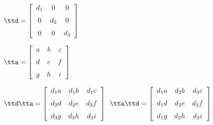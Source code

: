 {$\ttd = \left[ \begin {array}{ccc} d_1&0&0\\\noalign{\medskip}0&d_2&0
\\\noalign{\medskip}0&0&d_3\end {array} \right]$
 
$\tta = \left[ \begin {array}{ccc} a&b&c\\\noalign{\medskip}d&e&f
\\\noalign{\medskip}g&h&i\end {array} \right] $}
{$\ttd\tta= \left[ \begin {array}{ccc} d_1a&d_1b&d_1c\\\noalign{\medskip}d_2d&d_2e&d_2f
\\\noalign{\medskip}d_3g&d_3h&d_3i\end {array} \right] $\ 
$\tta\ttd =  \left[ \begin {array}{ccc} d_1a&d_2b&d_3c\\\noalign{\medskip}d_1d&d_2e&d_3f
\\\noalign{\medskip}d_1g&d_2h&d_3i\end {array} \right]$
}
 
